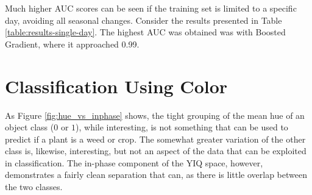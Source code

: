 \documentclass[letterpaper]{report}
\begin{document}
 Much higher AUC scores can be seen if the training set is limited to a specific day, avoiding all seasonal changes.  Consider the results presented in Table \ref{table:results-single-day}. The highest AUC was obtained was with Boosted Gradient, where it approached 0.99.


\begin{tiny}
\renewcommand{\arraystretch}{1.2}




\end{tiny}



\section{Classification Using Color}
As Figure \ref{fig:hue_vs_inphase} shows, the tight grouping of the mean hue of an object class ($0$ or $1$), while interesting, is not something that can be used to predict if a plant is a weed or crop.  The somewhat greater variation of the other class is, likewise, interesting, but not an aspect of the data that can be exploited in classification. The in-phase component of the YIQ space, however, demonstrates a fairly clean separation that can, as there is little overlap between the two classes.
\end{document}
